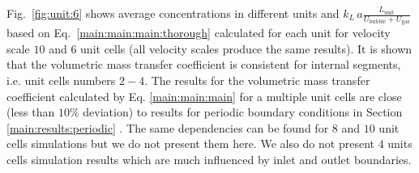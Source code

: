 \documentclass{article}
\newcommand{\beq}{\begin{equation}}
\newcommand{\feq}{\end{equation}}
\newcommand{\beqal}{\begin{equation}\begin{aligned}}
\newcommand{\feqal}{\end{aligned}\end{equation}}
\newcommand{\vol}{k_L\,a}
\newcommand{\lunit}{L_{\mathrm{unit}}}
\newcommand{\ububble}{U_{\mathrm{bubble}}}
\newcommand{\uliq}{U_{\mathrm{liq}}}
\newcommand{\ugas}{U_{\mathrm{gas}}}
\newcommand{\cstar}{C^{*}}
\newcommand{\volnondim}{\vol \frac{\lunit}{\ububble+\ugas}}
\begin{document}
Fig.~\ref{fig:unit:6} shows average concentrations in different units and $\volnondim$ based on
Eq.~\ref{main:main:main:thorough} calculated for each unit for velocity
scale $10$ and  $6$ unit cells (all velocity scales produce the same results). It is shown that the
volumetric mass transfer coefficient is consistent for internal segments, i.e.
unit cells numbers $2-4$.  The results for the volumetric mass transfer
coefficient calculated by Eq. \ref{main:main:main} for a multiple unit cells are
close (less than $10\%$ deviation) to results for periodic boundary conditions in Section
\ref{main:results:periodic} . 
The same dependencies
can be found for
$8$ and $10$ unit cells simulations but we do not present them here. We also do not present $4$
units cells simulation results which are much influenced by inlet and outlet boundaries.
\end{document}
